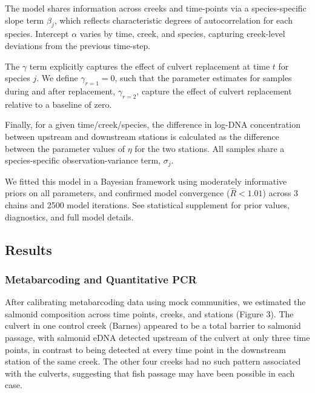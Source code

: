 \documentclass[
]{article}
\begin{document}
The model shares information across creeks and time-points via a
species-specific slope term \(\beta_{j}\), which reflects characteristic
degrees of autocorrelation for each species. Intercept \(\alpha\) varies
by time, creek, and species, capturing creek-level deviations from the
previous time-step.

The \(\gamma\) term explicitly captures the effect of culvert
replacement at time \(t\) for species \(j\). We define
\(\gamma_{r = 1} = 0\), such that the parameter estimates for samples
during and after replacement, \(\gamma_{r = 2}\), capture the effect of
culvert replacement relative to a baseline of zero.

Finally, for a given time/creek/species, the difference in log-DNA
concentration between upstream and downstream stations is calculated as
the difference between the parameter values of \(\eta\) for the two
stations. All samples share a species-specific observation-variance
term, \(\sigma_{j}\).

We fitted this model in a Bayesian framework using moderately
informative priors on all parameters, and confirmed model convergence
(\(\hat{R} < 1.01\)) across 3 chains and 2500 model iterations. See
statistical supplement for prior values, diagnostics, and full model
details.

\hypertarget{results}{%
\subsection{Results}\label{results}}

\hypertarget{metabarcoding-and-quantitative-pcr}{%
\subsubsection{Metabarcoding and Quantitative
PCR}\label{metabarcoding-and-quantitative-pcr}}

After calibrating metabarcoding data using mock communities, we
estimated the salmonid composition across time points, creeks, and
stations (Figure 3). The culvert in one control creek (Barnes) appeared
to be a total barrier to salmonid passage, with salmonid eDNA detected
upstream of the culvert at only three time points, in contrast to being
detected at every time point in the downstream station of the same
creek. The other four creeks had no such pattern associated with the
culverts, suggesting that fish passage may have been possible in each
case.
\end{document}
